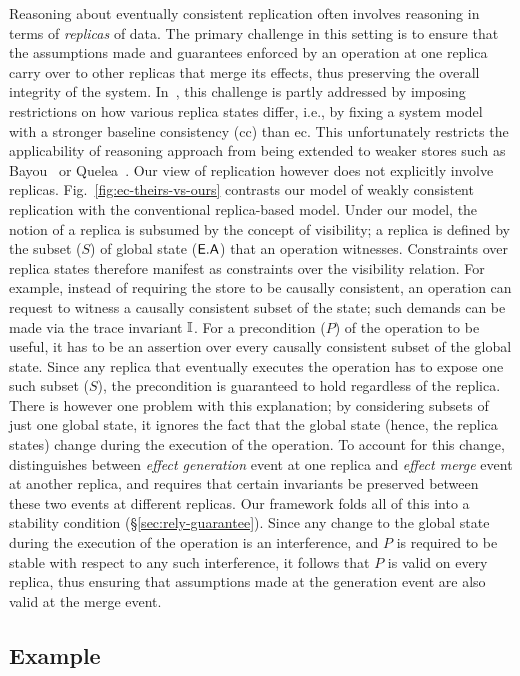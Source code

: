 Reasoning about eventually consistent replication often involves
reasoning in terms of \emph{replicas} of data. The primary challenge
in this setting is to ensure that the assumptions made and guarantees
enforced by an operation at one replica carry over to other replicas
that merge its effects, thus preserving the overall integrity of the
system. In~\cite{gotsmanpopl16}, this challenge is partly addressed by
imposing restrictions on how various replica states differ, i.e., by
fixing a system model with a stronger baseline consistency ({\sc cc})
than {\sc ec}. This unfortunately restricts the applicability of
reasoning approach from being extended to weaker stores such as
Bayou~\cite{bayou} or Quelea~\cite{pldi15}. Our view of replication
however does not explicitly involve replicas.
Fig.~\ref{fig:ec-theirs-vs-ours} contrasts our model of weakly
consistent replication with the conventional replica-based model.
Under our model, the notion of a replica is subsumed by the concept of
visibility; a replica is defined by the subset ($S$) of global state
($\textsf{E}.\textsf{A}$) that an operation witnesses. Constraints over replica states
therefore manifest as constraints over the visibility relation.  For
example, instead of requiring the store to be causally consistent, an
operation can request to witness a causally consistent subset of the
state; such demands can be made via the trace invariant $\mathbb{I}$. For a
precondition ($P$) of the operation to be useful, it has to be an
assertion over every causally consistent subset of the global state.
Since any replica that eventually executes the operation has to expose
one such subset ($S$), the precondition is guaranteed to hold
regardless of the replica. There is however one problem with this
explanation; by considering subsets of just one global state, it
ignores the fact that the global state (hence, the replica states)
change during the execution of the operation. To account for this
change,~\cite{gotsmanpopl16} distinguishes between \emph{effect
generation} event at one replica and \emph{effect merge} event at
another replica, and requires that certain invariants be preserved
between these two events at different replicas. Our framework folds
all of this into a stability condition (\S\ref{sec:rely-guarantee}).
Since any change to the global state during the execution of the
operation is an interference, and $P$ is required to be stable with
respect to any such interference, it follows that $P$ is valid on
every replica, thus ensuring that assumptions made at the generation
event are also valid at the merge event.

\subsection{Example}

